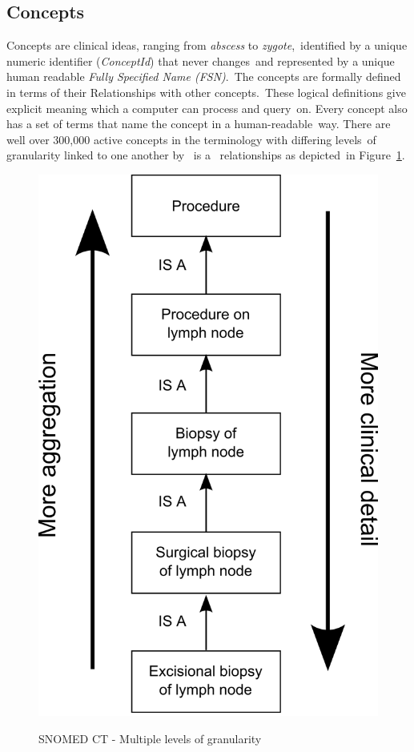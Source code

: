\documentclass[DIV=calc, paper=a4, fontsize=12pt, onecolumn]{scrartcl}	 %
\begin{document}
  \subsection{Concepts}
  Concepts are clinical ideas, ranging from \emph{abscess} to \emph{zygote},\
  identified by a unique numeric identifier (\textit{ConceptId}) that never changes\
  and represented by a unique human readable \textit{Fully Specified Name (FSN)}.\
  The concepts are formally defined in terms of their Relationships with other concepts.\
  These logical definitions give explicit meaning which a computer can process and query\
  on. Every concept also has a set of terms that name the concept in a human-readable\
  way. There are well over 300,000 active concepts in the terminology with differing levels\
  of granularity linked to one another by \textbar ~is a \textbar ~relationships as depicted\
  in Figure~\ref{fig:snomedct_concepts_granularity}.\\
  \begin{figure}[!ht]
    \centering
    \includegraphics[scale=1]{granularity.png}
    \caption{SNOMED CT - Multiple levels of granularity}\citep[Fig.~1]{snomed_-_user_guide_snomed_2011}
    \label{fig:snomedct_concepts_granularity}
  \end{figure}
\end{document}
